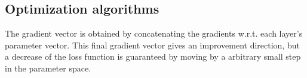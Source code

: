     \subsection{Optimization algorithms}

        The gradient vector is obtained by concatenating the gradients w.r.t.
	each layer's parameter vector. This final gradient vector
        gives an improvement direction, but a decrease of the loss function
	is guaranteed by moving by a arbitrary small step in the parameter space.




